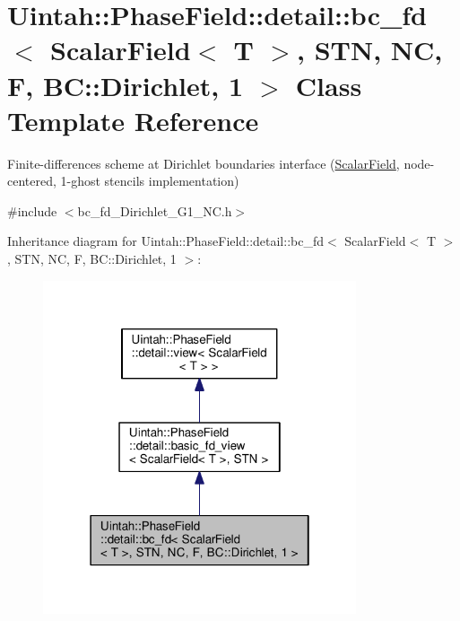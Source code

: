 \hypertarget{classUintah_1_1PhaseField_1_1detail_1_1bc__fd_3_01ScalarField_3_01T_01_4_00_01STN_00_01NC_00_01Fc8a6e28ffa258d282d0a921216b0ed9f}{}\section{Uintah\+:\+:Phase\+Field\+:\+:detail\+:\+:bc\+\_\+fd$<$ Scalar\+Field$<$ T $>$, S\+TN, NC, F, BC\+:\+:Dirichlet, 1 $>$ Class Template Reference}
\label{classUintah_1_1PhaseField_1_1detail_1_1bc__fd_3_01ScalarField_3_01T_01_4_00_01STN_00_01NC_00_01Fc8a6e28ffa258d282d0a921216b0ed9f}


Finite-\/differences scheme at Dirichlet boundaries interface (\hyperlink{structUintah_1_1PhaseField_1_1ScalarField}{Scalar\+Field}, node-\/centered, 1-\/ghost stencils implementation)  




{\ttfamily \#include $<$bc\+\_\+fd\+\_\+\+Dirichlet\+\_\+\+G1\+\_\+\+N\+C.\+h$>$}



Inheritance diagram for Uintah\+:\+:Phase\+Field\+:\+:detail\+:\+:bc\+\_\+fd$<$ Scalar\+Field$<$ T $>$, S\+TN, NC, F, BC\+:\+:Dirichlet, 1 $>$\+:\nopagebreak
\begin{figure}[H]
\begin{center}
\leavevmode
\includegraphics[width=262pt]{classUintah_1_1PhaseField_1_1detail_1_1bc__fd_3_01ScalarField_3_01T_01_4_00_01STN_00_01NC_00_01Ff5eba3bbc4b2be3767e5d6d06f2601f7}
\end{center}
\end{figure}


